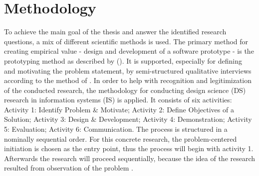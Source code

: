 \chapter{Methodology}


\noindent
To achieve the main goal of the thesis and answer the identified research questions,
a mix of different scientific methods is used.
The primary method for creating empirical value - design and development of a software prototype - is the prototyping method as described by
\citeauthor{riedlManagementInformatik2019} (\citeyear{riedlManagementInformatik2019}).
It is supported, especially for defining and motivating the problem statement, by
semi-structured qualitative interviews according to the method of \autocite{glaser2010experteninterviews}.
%
In order to help with recognition and legitimization of the conducted research,
the methodology for conducting design science (DS) research
in information systems (IS)
\autocite{designScienceResearchMethodologyForInformationSystemsResearch}
is applied.
It consists of six activities:
Activity 1: Identify Problem \& Motivate;
Activity 2: Define Objectives of a Solution;
Activity 3: Design \& Development;
Activity 4: Demonstration;
Activity 5: Evaluation;
Activity 6: Communication.
%
%
The process is structured in a nominally sequential order.
For this concrete research,
the problem-centered initiation is chosen as the entry point,
thus the process will begin with activity 1.
Afterwards the research will proceed sequentially,
because the idea of the research resulted from observation of the problem
\autocite{designScienceResearchMethodologyForInformationSystemsResearch}.

